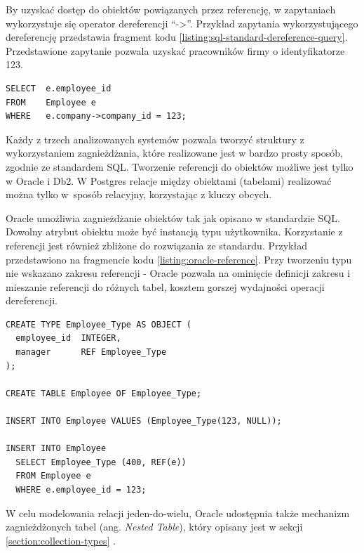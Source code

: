 \documentclass[a4paper,twoside,12pt]{book}
\begin{document}
By uzyskać dostęp do obiektów powiązanych przez referencję, w zapytaniach wykorzystuje się operator dereferencji ``->''. Przykład zapytania wykorzystującego dereferencję przedstawia fragment kodu \ref{listing:sql-standard-dereference-query}. Przedstawione zapytanie pozwala uzyskać pracowników firmy o identyfikatorze 123.

\begin{lstlisting}[style=SQL, caption={Zapytanie wykorzystujące dereferencję według standardu SQL.}, label={listing:sql-standard-dereference-query}, captionpos=b]
SELECT  e.employee_id
FROM    Employee e
WHERE   e.company->company_id = 123;
\end{lstlisting}

Każdy z trzech analizowanych systemów pozwala tworzyć struktury z wykorzystaniem zagnieżdżania, które realizowane jest w bardzo prosty sposób, zgodnie ze standardem SQL. Tworzenie referencji do obiektów możliwe jest tylko w Oracle i Db2. W Postgres relacje między obiektami (tabelami) realizować można tylko w~sposób relacyjny, korzystając z kluczy obcych.

Oracle umożliwia zagnieżdżanie obiektów tak jak opisano w standardzie SQL. Dowolny atrybut obiektu może być instancją typu użytkownika. Korzystanie z referencji jest również zbliżone do rozwiązania ze standardu. Przykład przedstawiono na fragmencie kodu \ref{listing:oracle-reference}. Przy tworzeniu typu nie wskazano zakresu referencji - Oracle pozwala na ominięcie definicji zakresu i mieszanie referencji do różnych tabel, kosztem gorszej wydajności operacji dereferencji.

\begin{lstlisting}[style=SQL, caption={Korzystanie z referencji w Oracle Database.}, label={listing:oracle-reference}, captionpos=b]
CREATE TYPE Employee_Type AS OBJECT (
  employee_id  INTEGER,
  manager      REF Employee_Type
);

CREATE TABLE Employee OF Employee_Type;

INSERT INTO Employee VALUES (Employee_Type(123, NULL));
   
INSERT INTO Employee
  SELECT Employee_Type (400, REF(e))
  FROM Employee e
  WHERE e.employee_id = 123;
\end{lstlisting}

W celu modelowania relacji jeden-do-wielu, Oracle udostępnia także mechanizm zagnieżdżonych tabel (ang. \textit{Nested Table}), który opisany jest w sekcji \ref{section:collection-types} .
\end{document}
